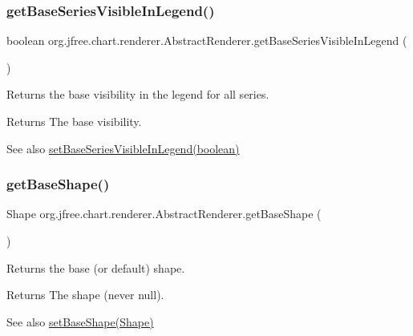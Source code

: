 \subsubsection{\texorpdfstring{get\+Base\+Series\+Visible\+In\+Legend()}{getBaseSeriesVisibleInLegend()}}
{\footnotesize\ttfamily boolean org.\+jfree.\+chart.\+renderer.\+Abstract\+Renderer.\+get\+Base\+Series\+Visible\+In\+Legend (\begin{DoxyParamCaption}{ }\end{DoxyParamCaption})}

Returns the base visibility in the legend for all series.

\begin{DoxyReturn}{Returns}
The base visibility.
\end{DoxyReturn}
\begin{DoxySeeAlso}{See also}
\mbox{\hyperlink{classorg_1_1jfree_1_1chart_1_1renderer_1_1_abstract_renderer_a9e6708a1410b3575666ecd84f2151f7c}{set\+Base\+Series\+Visible\+In\+Legend(boolean)}} 
\end{DoxySeeAlso}
\mbox{\label{classorg_1_1jfree_1_1chart_1_1renderer_1_1_abstract_renderer_a43dcca93629b149904310c59176c889a}} 
\subsubsection{\texorpdfstring{get\+Base\+Shape()}{getBaseShape()}}
{\footnotesize\ttfamily Shape org.\+jfree.\+chart.\+renderer.\+Abstract\+Renderer.\+get\+Base\+Shape (\begin{DoxyParamCaption}{ }\end{DoxyParamCaption})}

Returns the base (or default) shape.

\begin{DoxyReturn}{Returns}
The shape (never {\ttfamily null}).
\end{DoxyReturn}
\begin{DoxySeeAlso}{See also}
\mbox{\hyperlink{classorg_1_1jfree_1_1chart_1_1renderer_1_1_abstract_renderer_af60c105686a1d89902ed4897bdfe8e59}{set\+Base\+Shape(\+Shape)}} 
\end{DoxySeeAlso}
\mbox{\label{classorg_1_1jfree_1_1chart_1_1renderer_1_1_abstract_renderer_a7590a423fb0ba5895a876a7068b37951}} 
